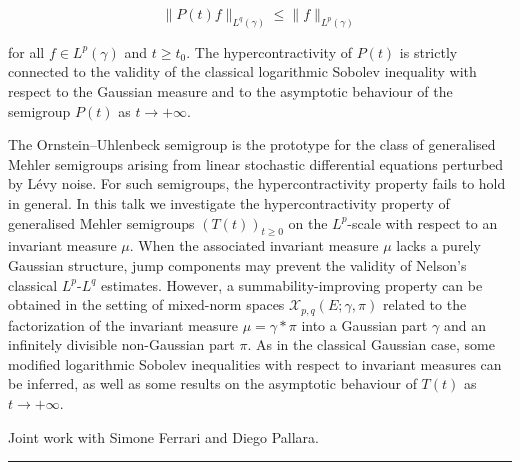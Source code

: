 \documentclass[a4paper,11pt]{article}
\begin{document}
$$\|P(t)f\|_{L^q(\gamma)} \le \|f\|_{L^p(\gamma)}$$

for all $f \in L^p(\gamma)$ and $t \ge t_0$. The hypercontractivity of $P(t)$ is strictly connected to the validity of the classical logarithmic Sobolev inequality with respect to the Gaussian measure and to the asymptotic behaviour of the semigroup $P(t)$ as $t \to +\infty$.

The Ornstein–Uhlenbeck semigroup is the prototype for the class of generalised Mehler semigroups arising from linear stochastic differential equations perturbed by Lévy noise. For such semigroups, the hypercontractivity property fails to hold in general. In this talk we investigate the hypercontractivity property of generalised Mehler semigroups $(T(t))_{t \ge 0}$ on the $L^p$-scale with respect to an invariant measure $\mu$. When the associated invariant measure $\mu$ lacks a purely Gaussian structure, jump components may prevent the validity of Nelson's classical $L^p$-$L^q$ estimates. However, a summability-improving property can be obtained in the setting of mixed-norm spaces $\mathcal{X}_{p,q}(E;\gamma,\pi)$ related to the factorization of the invariant measure $\mu = \gamma * \pi$ into a Gaussian part $\gamma$ and an infinitely divisible non-Gaussian part $\pi$. As in the classical Gaussian case, some modified logarithmic Sobolev inequalities with respect to invariant measures can be inferred, as well as some results on the asymptotic behaviour of $T(t)$ as $t \to +\infty$.

\smallskip
Joint work with Simone Ferrari and Diego Pallara.

\newpage

\noindent\rule{\textwidth}{0.4pt}
\end{document}
